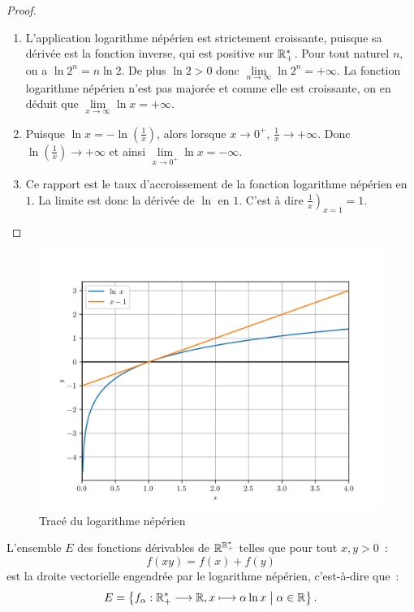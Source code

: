 \begin{proof}
  \begin{enumerate}
    \item L'application logarithme népérien est strictement croissante, puisque 
      sa dérivée est la fonction inverse, qui est positive sur \(\mathbb{R}_{+}^{*}\).  
      Pour tout naturel \(n\), on a \(\ln 2^n = n \ln 2\). De plus \(\ln 2 >0\) 
      donc \(\lim\limits_{n \to \infty} \ln 2^n = + \infty\). La fonction 
      logarithme népérien n'est pas majorée et comme elle est croissante, on en 
      déduit que \(\lim\limits_{x \to \infty} \ln x = +\infty\).
    \item Puisque \(\ln x = - \ln\left(\frac{1}{x}\right)\), alors lorsque 
      \(x\to 0^+\), \(\frac{1}{x} \to + \infty\). Donc \(\ln 
      \left(\frac{1}{x}\right) \to +\infty\) et ainsi \(\lim\limits_{x \to 0^+} 
      \ln x = - \infty\).
    \item Ce rapport est le taux d'accroissement de la fonction logarithme 
      népérien en \(1\). La limite est donc la dérivée de \(\ln\) en \(1\).  
      C'est à dire \(\left.\frac{1}{x}\right)_{x = 1} = 1\).
  \end{enumerate}
\end{proof}

\begin{figure}
  \centering
  \includegraphics[scale = 1.0]{lognep.png}
  \caption{Tracé du logarithme népérien}
  \label{fig:traceln}
\end{figure}

\begin{theo}
  L'ensemble \(E\) des fonctions dérivables de \(\mathbb{R}^{\mathbb{R}_{+}^{*}}\) telles que 
  pour tout \(x,y>0\)~:
  \begin{equation}
    \label{eq:fonclog}
    f(xy) = f(x)+f(y)
  \end{equation}
  est la droite vectorielle engendrée par le logarithme népérien, c'est-à-dire 
  que~:
  \[E = \left\{f_{\alpha}:\mathbb{R}_{+}^{*} \longrightarrow \mathbb{R}, x \longmapsto \alpha \ln x\mathrel{}\middle|\mathrel{}\alpha 
  \in \mathbb{R}\right\}.\]
\end{theo}

